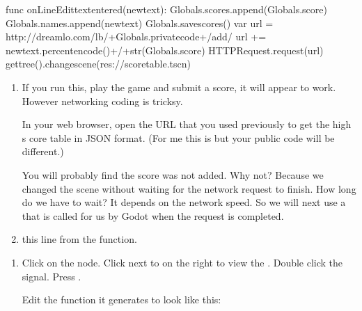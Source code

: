 \documentclass[letterpaper,10pt,english]{sphinxmanual}
\begin{document}
\begin{sphinxVerbatim}[commandchars=\\\{\}]
func \PYGZus{}on\PYGZus{}LineEdit\PYGZus{}text\PYGZus{}entered(new\PYGZus{}text):
    Globals.scores.append(Globals.score)
    Globals.names.append(new\PYGZus{}text)
    Globals.save\PYGZus{}scores()
    var url = \PYGZdq{}http://dreamlo.com/lb/\PYGZdq{}+Globals.private\PYGZus{}code+\PYGZdq{}/add/\PYGZdq{}
    url += new\PYGZus{}text.percent\PYGZus{}encode()+\PYGZdq{}/\PYGZdq{}+str(Globals.score)
    \PYGZdl{}HTTPRequest.request(url)
    get\PYGZus{}tree().change\PYGZus{}scene(\PYGZdq{}res://score\PYGZus{}table.tscn\PYGZdq{})
\end{sphinxVerbatim}
\begin{enumerate}
%
\setcounter{enumi}{2}
\item {} 
\sphinxAtStartPar
If you run this, play the game and submit a score, it will appear to
work. However networking coding is tricksy.

\sphinxAtStartPar
In your web browser, open the URL that you used previously to get the
high s core table in JSON format. (For me this is
 but your public
code will be different.)

\sphinxAtStartPar
You will probably find the score was not added. Why not? Because we
changed the scene without waiting for the network request to finish.
How long do we have to wait? It depends on the network speed. So we
will next use a  that is called for us by Godot
when the request is completed.

\item {} 
\sphinxAtStartPar
{} this line from the  function.

\end{enumerate}

\begin{sphinxVerbatim}[commandchars=\\\{\}]
\end{sphinxVerbatim}
\begin{enumerate}
%
\setcounter{enumi}{4}
\item {} 
\sphinxAtStartPar
Click on the  node. Click  next to 
on the right to view the . Double click the
 signal. Press .

\sphinxAtStartPar
Edit the function it generates to look like this:

\end{enumerate}
\end{document}

